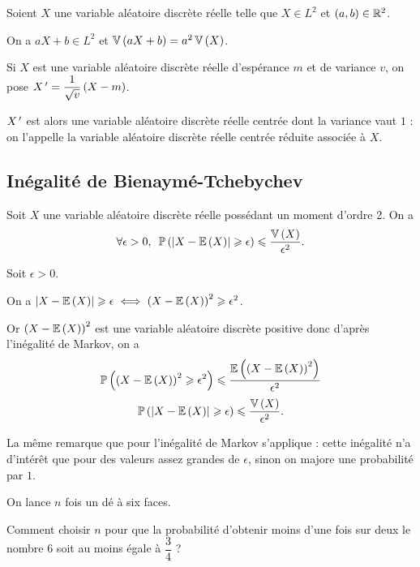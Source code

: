 \begin{prop}
Soient \(X\) une variable aléatoire discrète réelle telle que \(X\in L^2\) et \(\left(a,b\right)\in\mathbb{R}^2\).

On a \(aX+b\in L^2\) et \(\operatorname{\mathbb{V}}\left(aX+b\right)=a^2\operatorname{\mathbb{V}}\left(X\right)\).
\end{prop}

\begin{rem}
Si \(X\) est une variable aléatoire discrète réelle d'espérance \(m\) et de variance \(v\), on pose \(X^{\,\prime}=\dfrac{1}{\sqrt{v}}\left(X-m\right)\).

\(X^{\,\prime}\) est alors une variable aléatoire discrète réelle centrée dont la variance vaut \(1\) : on l'appelle la variable aléatoire discrète réelle centrée réduite associée à \(X\).
\end{rem}

\subsection{Inégalité de Bienaymé-Tchebychev}

\begin{prop}
Soit \(X\) une variable aléatoire discrète réelle possédant un moment d'ordre 2. On a \[\quantifs{\forall\epsilon>0}\proba{\abs{X-\esp{X}}\geq\epsilon}\leq\dfrac{\vari{X}}{\epsilon^2}.\]
\end{prop}

\begin{dem}
Soit \(\epsilon>0\).

On a \(\left\lvert X-\operatorname{\mathbb{E}}\left(X\right)\right\rvert\geqslant\epsilon\iff\left(X-\operatorname{\mathbb{E}}\left(X\right)\right)^2\geqslant\epsilon^2\).

Or \(\left(X-\operatorname{\mathbb{E}}\left(X\right)\right)^2\) est une variable aléatoire discrète positive donc d'après l'inégalité de Markov, on a \[\mathbb{P}\left(\left(X-\operatorname{\mathbb{E}}\left(X\right)\right)^2\geqslant\epsilon^2\right)\leqslant\dfrac{\operatorname{\mathbb{E}}\left(\left(X-\operatorname{\mathbb{E}}\left(X\right)\right)^2\right)}{\epsilon^2}\] \ie \[\mathbb{P}\left(\left\lvert X-\operatorname{\mathbb{E}}\left(X\right)\right\rvert\geqslant\epsilon\right)\leqslant\dfrac{\operatorname{\mathbb{V}}\left(X\right)}{\epsilon^2}.\]
\end{dem}

La même remarque que pour l'inégalité de Markov s'applique : cette inégalité n'a d'intérêt que pour des valeurs assez grandes de \(\epsilon\), sinon on majore une probabilité par \(1\).

\begin{exo}
On lance \(n\) fois un dé à six faces.

Comment choisir \(n\) pour que la probabilité d'obtenir moins d'une fois sur deux le nombre 6 soit au moins égale à \(\dfrac{3}{4}\) ?
\end{exo}

